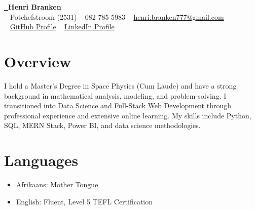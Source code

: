 \documentclass[a4paper,10pt]{article}
\begin{document}
	
\begin{center}
	{\LARGE\textbf{\href{https://henribranken.github.io/MyCV/}{\faHandPointer~}Henri Branken}}\\[0.5cm]
	\faHome~ Potchefstroom (2531) \quad
	\faPhone~ 082 785 5983 \quad
	\faEnvelope~ \href{mailto:henri.branken777@gmail.com}{henri.branken777@gmail.com}\\
	\faGithub~ \href{https://github.com/HenriBranken}{GitHub Profile} \quad
	\faLinkedin~ \href{https://www.linkedin.com/in/henri-branken-1423a2153/}{LinkedIn Profile}
\end{center}
	
\section*{Overview}
I hold a Master’s Degree in Space Physics (Cum Laude) and have a strong background in mathematical analysis, modeling, and problem-solving. I transitioned into Data Science and Full-Stack Web Development through professional experience and extensive online learning. My skills include Python, SQL, MERN Stack, Power BI, and data science methodologies.

\section*{Languages}
\begin{itemize}
	\item Afrikaans: Mother Tongue
	\item English: Fluent, Level 5 TEFL Certification
\end{itemize}
\end{document}
